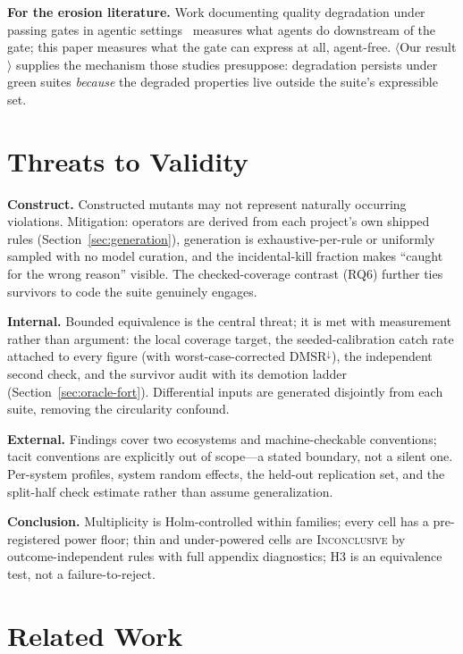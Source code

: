 \documentclass[conference]{IEEEtran}
\newcommand{\ph}[1]{\colorbox{yellow!35}{\small$\langle$\textsf{#1}$\rangle$}}
\newcommand{\dmsr}{\mathrm{DMSR}}
\begin{document}
\textbf{For the erosion literature.} Work documenting quality degradation under passing gates in agentic settings~\cite{slopcodebench,constraintdecay} measures what agents do downstream of the gate; this paper measures what the gate can express at all, agent-free. \ph{Our result} supplies the mechanism those studies presuppose: degradation persists under green suites \emph{because} the degraded properties live outside the suite's expressible set.

\section{Threats to Validity}\label{sec:threats}

\textbf{Construct.} Constructed mutants may not represent naturally occurring violations. Mitigation: operators are derived from each project's own shipped rules (Section~\ref{sec:generation}), generation is exhaustive-per-rule or uniformly sampled with no model curation, and the incidental-kill fraction makes ``caught for the wrong reason'' visible. The checked-coverage contrast (RQ6) further ties survivors to code the suite genuinely engages.

\textbf{Internal.} Bounded equivalence is the central threat; it is met with measurement rather than argument: the local coverage target, the seeded-calibration catch rate attached to every figure (with worst-case-corrected $\dmsr^{\downarrow}$), the independent second check, and the survivor audit with its demotion ladder (Section~\ref{sec:oracle-fort}). Differential inputs are generated disjointly from each suite, removing the circularity confound.

\textbf{External.} Findings cover two ecosystems and machine-checkable conventions; tacit conventions are explicitly out of scope---a stated boundary, not a silent one. Per-system profiles, system random effects, the held-out replication set, and the split-half check estimate rather than assume generalization.

\textbf{Conclusion.} Multiplicity is Holm-controlled within families; every cell has a pre-registered power floor; thin and under-powered cells are \textsc{Inconclusive} by outcome-independent rules with full appendix diagnostics; H3 is an equivalence test, not a failure-to-reject.

\section{Related Work}\label{sec:related}
\end{document}
